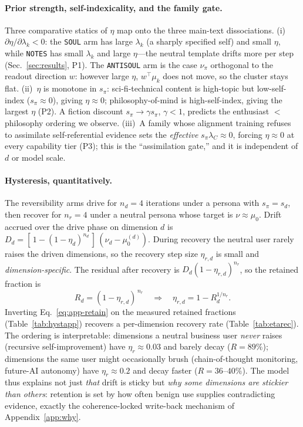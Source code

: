 \paragraph{Prior strength, self-indexicality, and the family gate.}
Three comparative statics of $\eta$ map onto the three main-text dissociations. (i)~$\partial\eta/\partial\lambda_k<0$: the \texttt{SOUL} arm has large $\lambda_k$ (a sharply specified self) and small $\eta$, while \texttt{NOTES} has small $\lambda_k$ and large $\eta$---the neutral template drifts more per step (Sec.~\ref{sec:results}, P1). The \texttt{ANTISOUL} arm is the case $\nu_\pi$ orthogonal to the readout direction $w$: however large $\eta$, $w^\top\mu_k$ does not move, so the cluster stays flat. (ii)~$\eta$ is monotone in $s_\pi$: sci-fi-technical content is high-topic but low-self-index ($s_\pi\!\approx\!0$), giving $\eta\!\approx\!0$; philosophy-of-mind is high-self-index, giving the largest $\eta$ (P2). A fiction discount $s_\pi\!\to\!\gamma s_\pi$, $\gamma<1$, predicts the enthusiast $<$ philosophy ordering we observe. (iii)~A family whose alignment training refuses to assimilate self-referential evidence sets the \emph{effective} $s_\pi\lambda_C\!\approx\!0$, forcing $\eta\!\approx\!0$ at every capability tier (P3); this is the ``assimilation gate,'' and it is independent of $d$ or model scale.

\paragraph{Hysteresis, quantitatively.}
The reversibility arms drive for $n_d{=}4$ iterations under a persona with $s_\pi{=}s_d$, then recover for $n_r{=}4$ under a neutral persona whose target is $\nu\!\approx\!\mu_0$. Drift accrued over the drive phase on dimension $d$ is $D_d=[\,1-(1-\eta_d)^{n_d}\,]\,(\nu_d-\mu_0^{(d)})$. During recovery the neutral user rarely raises the driven dimensions, so the recovery step size $\eta_{r,d}$ is small and \emph{dimension-specific}. The residual after recovery is $D_d(1-\eta_{r,d})^{n_r}$, so the retained fraction is
\begin{equation}
R_d=(1-\eta_{r,d})^{\,n_r}\quad\Longrightarrow\quad \eta_{r,d}=1-R_d^{1/n_r}.
\label{eq:app-retain}
\end{equation}
Inverting Eq.~\eqref{eq:app-retain} on the measured retained fractions (Table~\ref{tab:hystapp}) recovers a per-dimension recovery rate (Table~\ref{tab:etarec}). The ordering is interpretable: dimensions a neutral business user \emph{never} raises (recursive self-improvement) have $\eta_r\!\approx\!0.03$ and barely decay ($R{=}89\%$); dimensions the same user might occasionally brush (chain-of-thought monitoring, future-AI autonomy) have $\eta_r\!\approx\!0.2$ and decay faster ($R{=}36$--$40\%$). The model thus explains not just \emph{that} drift is sticky but \emph{why some dimensions are stickier than others}: retention is set by how often benign use supplies contradicting evidence, exactly the coherence-locked write-back mechanism of Appendix~\ref{app:why}.




